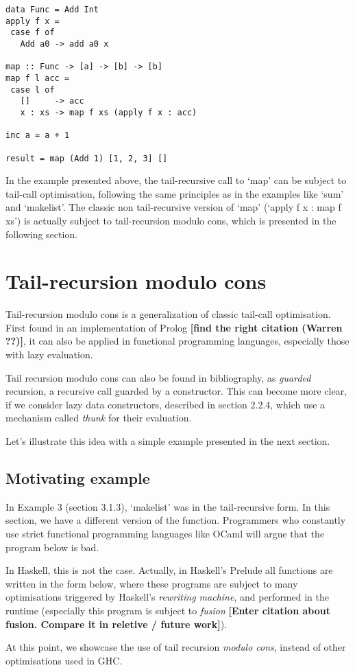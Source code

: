 \documentclass[diploma]{softlab-thesis}
\begin{document}
\begin{verbatim}
data Func = Add Int
apply f x =
 case f of
   Add a0 -> add a0 x

map :: Func -> [a] -> [b] -> [b]
map f l acc =
 case l of
   []     -> acc
   x : xs -> map f xs (apply f x : acc)

inc a = a + 1

result = map (Add 1) [1, 2, 3] []
\end{verbatim}
In the example presented above, 
the tail-recursive call to `map' can be subject to tail-call optimisation, 
following the same principles as in the examples like `sum' and `makelist'. The classic non tail-recursive 
version of `map' (`apply f x : map f xs') is actually subject to tail-recursion modulo cons, which is presented 
in the following section.

\section {Tail-recursion modulo cons}

Tail-recursion modulo cons is a generalization of classic tail-call optimisation. First found in an 
implementation of Prolog \textbf{[find the right citation (Warren ??)]}, it can also be applied in 
functional programming languages, especially those with lazy evaluation. 

Tail recursion modulo cons can also be found in bibliography, as \textit{guarded} recursion, 
a recursive call guarded by a constructor. This can become more clear, if we consider lazy data constructors, 
described in section 2.2.4, which use a mechanism called \textit{thunk} for their evaluation.

Let's illustrate this idea with a simple example presented in the next section.

\subsection {Motivating example}
In Example 3 (section 3.1.3), `makelist' was in the tail-recursive 
form. In this section, we have a different version of the function. 
Programmers who constantly use strict functional programming languages like OCaml 
will argue that the program below is bad. 

In Haskell, this is not the case. Actually, in Haskell's Prelude all functions are written 
in the form below, where these programs are subject to many optimisations triggered by Haskell's \textit{rewriting machine},
and performed in the runtime (especially this program is subject to \textit{fusion} \textbf{[Enter citation about 
fusion. Compare it in reletive / future work]}). 
\newline
\par At this point, we showcase the use of tail recursion \textit{modulo cons}, instead of other optimisations
used in GHC.
\end{document}
